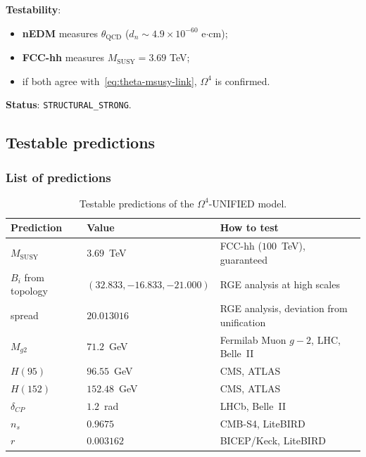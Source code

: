 \documentclass[11pt,a4paper]{article}
\newcommand{\Om}{\ensuremath{\Omega^4}}
\theoremstyle{definition}
\begin{document}
\noindent
\textbf{Testability}:
\begin{itemize}
    \item \textbf{nEDM} measures $\theta_{\text{QCD}}$ ($d_n \sim 4.9 \times 10^{-60}$ e$\cdot$cm);
    \item \textbf{FCC-hh} measures $M_{\text{SUSY}} = 3.69$ TeV;
    \item if both agree with~\eqref{eq:theta-msusy-link}, $\Om$ is confirmed.
\end{itemize}

\medskip\noindent
\textbf{Status}: \texttt{STRUCTURAL\_STRONG}.

\subsection{Testable predictions}
\label{subsec:conclusions-predictions}

\subsubsection{List of predictions}

\begin{table}[ht]
\centering
\caption{Testable predictions of the \texorpdfstring{$\Om$}{}-UNIFIED model.}
\label{tab:conclusions-predictions}
\begin{tabular}{p{4cm}p{4cm}p{5cm}}
\toprule
Prediction & Value & How to test \\
\midrule
$M_{\text{SUSY}}$ & $3.69$~TeV &
    FCC-hh ($100$~TeV), guaranteed \\[0.3em]
$B_i$ from topology &
    $(32.833, -16.833, -21.000)$ &
    RGE analysis at high scales \\[0.3em]
spread &
    $20.013016$ &
    RGE analysis, deviation from unification \\[0.3em]
$M_{g2}$ &
    $71.2$~GeV &
    Fermilab Muon $g-2$, LHC, Belle~II \\[0.3em]
$H(95)$ &
    $96.55$~GeV &
    CMS, ATLAS \\[0.3em]
$H(152)$ &
    $152.48$~GeV &
    CMS, ATLAS \\[0.3em]
$\delta_{CP}$ &
    $1.2$~rad &
    LHCb, Belle~II \\[0.3em]
$n_s$ &
    $0.9675$ &
    CMB-S4, LiteBIRD \\[0.3em]
$r$ &
    $0.003162$ &
    BICEP/Keck, LiteBIRD \\
\bottomrule
\end{tabular}
\end{table}
\end{document}
